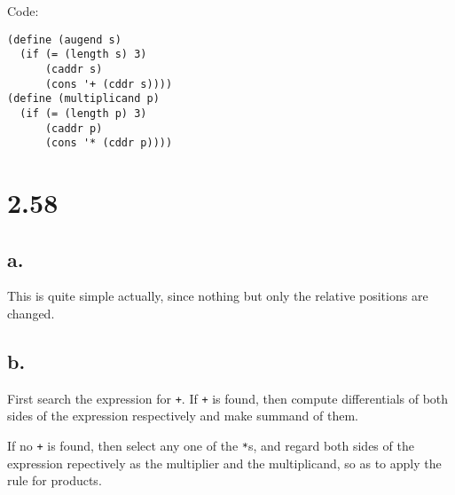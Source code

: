 \documentclass[../main.tex]{subfiles}
\begin{document}
Code:

\begin{lstlisting}
(define (augend s)
  (if (= (length s) 3)
      (caddr s)
      (cons '+ (cddr s))))
(define (multiplicand p)
  (if (= (length p) 3)
      (caddr p)
      (cons '* (cddr p))))
\end{lstlisting}

\section{2.58}

\subsection{a.}

This is quite simple actually, since
 nothing but only the relative positions
 are changed.

\subsection{b.}

First search the expression for \lstinline{+}.
 If \lstinline{+} is found, then compute
 differentials of both sides of the expression
 respectively and make summand of them.

If no \lstinline{+} is found, then select any
 one of the \lstinline{*}s, and regard both sides
 of the expression repectively as the multiplier
 and the multiplicand, so as to apply the rule
 for products.
\end{document}
